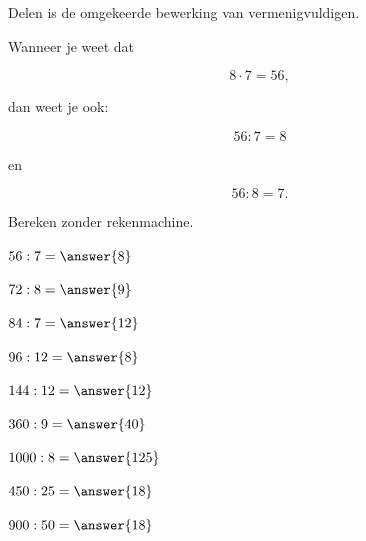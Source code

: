 \documentclass{ximera}
\begin{document}


Delen is de omgekeerde bewerking van vermenigvuldigen.

Wanneer je weet dat

\[
8\cdot7=56,
\]

dan weet je ook:

\[
56:7=8
\]

en

\[
56:8=7.
\]



\begin{oefening}[Basisdelingen]{\oefB\ESS}

Bereken zonder rekenmachine.

\begin{question} \(56:7=\answer{8}\) \end{question}

\begin{question} \(72:8=\answer{9}\) \end{question}

\begin{question} \(84:7=\answer{12}\) \end{question}

\begin{question} \(96:12=\answer{8}\) \end{question}

\begin{question} \(144:12=\answer{12}\) \end{question}

\begin{question} \(360:9=\answer{40}\) \end{question}

\begin{question} \(1000:8=\answer{125}\) \end{question}

\begin{question} \(450:25=\answer{18}\) \end{question}

\begin{question} \(900:50=\answer{18}\) \end{question}


\end{oefening}
\end{document}
